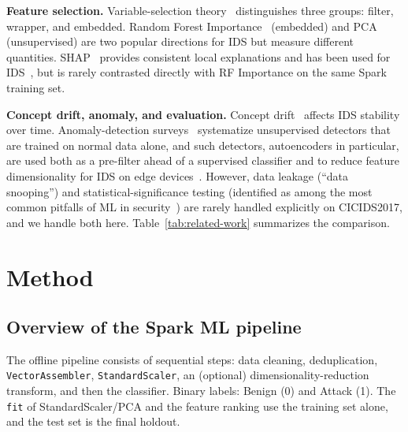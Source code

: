 \documentclass[11pt,conference,a4paper]{IEEEtran}
\begin{document}
\textbf{Feature selection.} Variable-selection theory~\cite{guyon2003introduction} distinguishes three groups: filter, wrapper, and embedded. Random Forest Importance~\cite{breiman2001random} (embedded) and PCA~\cite{jolliffe2002pca} (unsupervised) are two popular directions for IDS but measure different quantities. SHAP~\cite{lundberg2017unified} provides consistent local explanations and has been used for IDS~\cite{sarhan2022explainable}, but is rarely contrasted directly with RF Importance on the same Spark training set.

\textbf{Concept drift, anomaly, and evaluation.} Concept drift~\cite{gama2014survey} affects IDS stability over time. Anomaly-detection surveys~\cite{chandola2009anomaly,ruff2021unifying} systematize unsupervised detectors that are trained on normal data alone, and such detectors, autoencoders in particular, are used both as a pre-filter ahead of a supervised classifier and to reduce feature dimensionality for IDS on edge devices~\cite{lopez2017autoencoder,hasan2025iiot}. However, data leakage (``data snooping'') and statistical-significance testing (identified as among the most common pitfalls of ML in security~\cite{arp2022dosdonts}) are rarely handled explicitly on CICIDS2017, and we handle both here. Table~\ref{tab:related-work} summarizes the comparison.



\section{Method}
\label{sec:method}

\subsection{Overview of the Spark ML pipeline}

The offline pipeline consists of sequential steps: data cleaning, deduplication, \texttt{VectorAssembler}, \texttt{StandardScaler}, an (optional) dimensionality-reduction transform, and then the classifier. Binary labels: Benign (0) and Attack (1). The \texttt{fit} of StandardScaler/PCA and the feature ranking use the training set alone, and the test set is the final holdout.
\end{document}
